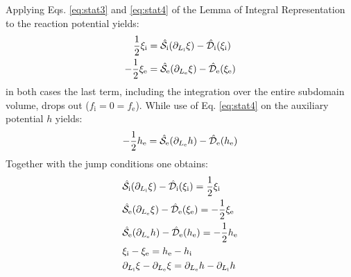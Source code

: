 Applying Eqs. \eqref{eq:stat3} and \eqref{eq:stat4} of the Lemma of Integral
Representation to the reaction potential yields:
\begin{align}
  \frac{1}{2}\xi_\mathrm{i} &= \hat{\mathcal{S}}_\mathrm{i}(\partial_{L_\mathrm{i}} \xi) -
  \hat{\mathcal{D}}_\mathrm{i}(\xi_\mathrm{i}) \\
  -\frac{1}{2}\xi_\mathrm{e} &= \hat{\mathcal{S}}_\mathrm{e}(\partial_{L_\mathrm{e}} \xi) -
  \hat{\mathcal{D}}_\mathrm{e}(\xi_\mathrm{e})
\end{align}
in both cases the last term, including the integration over the entire
subdomain volume, drops out ($f_\mathrm{i} = 0 = f_\mathrm{e}$).
While use of Eq. \eqref{eq:stat4} on the auxiliary potential $h$ yields:
\begin{equation}
  -\frac{1}{2}h_\mathrm{e} =
  \hat{\mathcal{S}}_\mathrm{e}(\partial_{L_\mathrm{e}} h) -
  \hat{\mathcal{D}}_\mathrm{e}(h_\mathrm{e})
\end{equation}
Together with the jump conditions one obtains:
\begin{subequations}
  \begin{align}
    &\hat{\mathcal{S}}_\mathrm{i}(\partial_{L_\mathrm{i}} \xi) - \hat{\mathcal{D}}_\mathrm{i}(\xi_\mathrm{i})
    = \frac{1}{2}\xi_\mathrm{i} \label{eq:first} \\
    &\hat{\mathcal{S}}_\mathrm{e}(\partial_{L_\mathrm{e}} \xi) - \hat{\mathcal{D}}_\mathrm{e}(\xi_\mathrm{e})
    = -\frac{1}{2}\xi_\mathrm{e} \label{eq:second} \\
  &\hat{\mathcal{S}}_\mathrm{e}(\partial_{L_\mathrm{e}} h) - \hat{\mathcal{D}}_\mathrm{e}(h_\mathrm{e})
  = -\frac{1}{2}h_\mathrm{e} \label{eq:third} \\
  &\xi_\mathrm{i} - \xi_\mathrm{e} = h_\mathrm{e} - h_\mathrm{i}
  \label{eq:fourth} \\
  &\partial_{L_\mathrm{i}} \xi - \partial_{L_\mathrm{e}} \xi = \partial_{L_\mathrm{e}} h - \partial_{L_\mathrm{i}} h
  \label{eq:fifth}
  \end{align}
\end{subequations}

